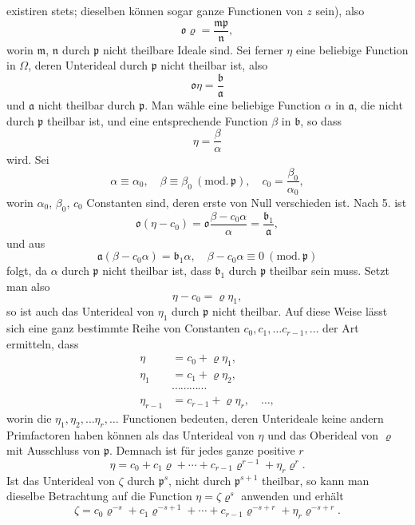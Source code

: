 \documentclass{article}
\begin{document}
existiren stets; dieselben können sogar ganze Functionen von $z$ sein), also
\[ \mathfrak{o}\varrho = \frac{\mathfrak{m}\mathfrak{p}}{\mathfrak{n}}, \]
worin $\mathfrak{m}$, $\mathfrak{n}$ durch $\mathfrak{p}$ nicht theilbare Ideale sind. Sei ferner $\eta$ eine beliebige Function in $\Omega$, deren Unterideal durch $\mathfrak{p}$ nicht theilbar ist, also
\[ \mathfrak{o}\eta = \frac{\mathfrak{b}}{\mathfrak{a}} \]
und $\mathfrak{a}$ nicht theilbar durch $\mathfrak{p}$. Man wähle eine beliebige Function $\alpha$ in $\mathfrak{a}$, die nicht durch $\mathfrak{p}$ theilbar ist, und eine entsprechende Function $\beta$ in $\mathfrak{b}$, so dass
\[ \eta = \frac{\beta}{\alpha} \]
wird. Sei
\[ \alpha \equiv \alpha_{0}, \quad \beta \equiv \beta_{0} \ (\text{mod.}\,\mathfrak{p}), \quad c_{0} = \frac{\beta_{0}}{\alpha_{0}}, \]
worin $\alpha_{0}$, $\beta_{0}$, $c_{0}$ Constanten sind, deren erste von Null verschieden ist. Nach 5. ist
\[ \mathfrak{o}(\eta - c_{0}) = \mathfrak{o}\frac{\beta - c_{0}\alpha}{\alpha} = \frac{\mathfrak{b}_{1}}{\mathfrak{a}}, \]
und aus
\[ \mathfrak{a}(\beta - c_{0}\alpha) = \mathfrak{b}_{1}\alpha, \quad \beta - c_{0}\alpha \equiv 0 \ (\text{mod.}\,\mathfrak{p}) \]
folgt, da $\alpha$ durch $\mathfrak{p}$ nicht theilbar ist, dass $\mathfrak{b}_{1}$ durch $\mathfrak{p}$ theilbar sein muss. Setzt man also
\[ \eta - c_{0} = \varrho\eta_{1}, \]
so ist auch das Unterideal von $\eta_{1}$ durch $\mathfrak{p}$ nicht theilbar. Auf diese Weise lässt sich eine ganz bestimmte Reihe von Constanten $c_{0}, c_{1}, \ldots c_{r-1}, \ldots$ der Art ermitteln, dass
\[ \begin{aligned} \eta &= c_{0} + \varrho\eta_{1}, \\ \eta_{1} &= c_{1} + \varrho\eta_{2}, \\ &\cdots\cdots\cdots\cdots \\ \eta_{r-1} &= c_{r-1} + \varrho\eta_{r}, \quad \ldots, \end{aligned} \]
worin die $\eta_{1}, \eta_{2}, \ldots \eta_{r}, \ldots$ Functionen bedeuten, deren Unterideale keine andern Primfactoren haben können als das Unterideal von $\eta$ und das Oberideal von $\varrho$ mit Ausschluss von $\mathfrak{p}$. Demnach ist für jedes ganze positive $r$
\[ \eta = c_{0} + c_{1}\varrho + \cdots + c_{r-1}\varrho^{r-1} + \eta_{r}\varrho^{r}. \]
Ist das Unterideal von $\zeta$ durch $\mathfrak{p}^{s}$, nicht durch $\mathfrak{p}^{s+1}$ theilbar, so kann man dieselbe Betrachtung auf die Function $\eta = \zeta\varrho^{s}$ anwenden und erhält
\[ \zeta = c_{0}\varrho^{-s} + c_{1}\varrho^{-s+1} + \cdots + c_{r-1}\varrho^{-s+r} + \eta_{r}\varrho^{-s+r}. \]
\end{document}
